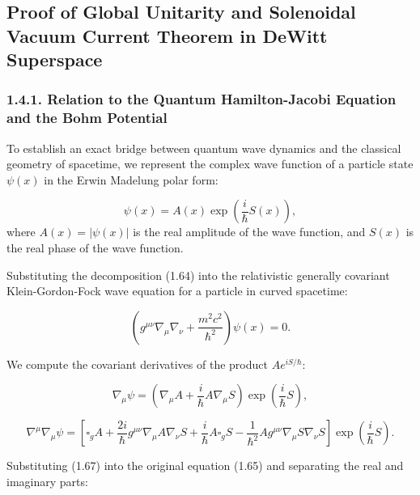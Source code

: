 \subsection{Proof of Global Unitarity and Solenoidal Vacuum Current Theorem in DeWitt Superspace}\label{sec:1.4}

\subsubsection{1.4.1. Relation to the Quantum Hamilton-Jacobi Equation and the Bohm Potential}\label{sec:1.4.1}

To establish an exact bridge between quantum wave dynamics and the classical geometry of spacetime, we represent the complex wave function of a particle state $\psi(x)$ in the Erwin Madelung polar form:

\begin{equation}\label{eq:1.64}\tag{1.64}
\psi(x) = A(x) \exp\left( \frac{i}{\hbar} S(x) \right),
\end{equation}
where $A(x) = |\psi(x)|$ is the real amplitude of the wave function, and $S(x)$ is the real phase of the wave function.

Substituting the decomposition (1.64) into the relativistic generally covariant Klein-Gordon-Fock wave equation for a particle in curved spacetime:

\begin{equation}\label{eq:1.65}\tag{1.65}
\left( g^{\mu\nu}\nabla_\mu \nabla_\nu + \frac{m^2 c^2}{\hbar^2} \right) \psi(x) = 0.
\end{equation}

We compute the covariant derivatives of the product $A e^{i S/\hbar}$:

\begin{equation}\label{eq:1.66}\tag{1.66}
\nabla_\mu \psi = \left( \nabla_\mu A + \frac{i}{\hbar} A \nabla_\mu S \right) \exp\left( \frac{i}{\hbar} S \right),
\end{equation}

\begin{equation}\label{eq:1.67}\tag{1.67}
\nabla^\mu \nabla_\mu \psi = \left[ \square_g A + \frac{2i}{\hbar} g^{\mu\nu}\nabla_\mu A \nabla_\nu S + \frac{i}{\hbar} A \square_g S - \frac{1}{\hbar^2} A g^{\mu\nu}\nabla_\mu S \nabla_\nu S \right] \exp\left( \frac{i}{\hbar} S \right).
\end{equation}

Substituting (1.67) into the original equation (1.65) and separating the real and imaginary parts:

